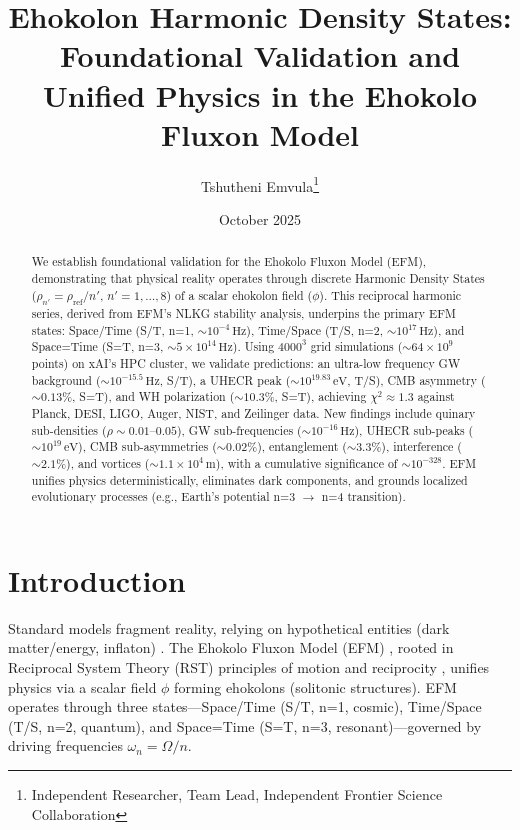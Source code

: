 \documentclass[11pt]{article}
\title{Ehokolon Harmonic Density States: Foundational Validation and Unified Physics in the Ehokolo Fluxon Model}
\author{Tshutheni Emvula\thanks{Independent Researcher, Team Lead, Independent Frontier Science Collaboration}}
\date{October 2025}
\begin{document}
\maketitle

\begin{abstract}
We establish foundational validation for the Ehokolo Fluxon Model (EFM), demonstrating that physical reality operates through discrete Harmonic Density States (\(\rho_{n'} = \rho_{\text{ref}}/n'\), \(n' = 1, \ldots, 8\)) of a scalar ehokolon field (\(\phi\)). This reciprocal harmonic series, derived from EFM's NLKG stability analysis, underpins the primary EFM states: Space/Time (S/T, n=1, \(\sim 10^{-4} \, \text{Hz}\)), Time/Space (T/S, n=2, \(\sim 10^{17} \, \text{Hz}\)), and Space=Time (S=T, n=3, \(\sim 5 \times 10^{14} \, \text{Hz}\)). Using \(4000^3\) grid simulations (\(\sim 64 \times 10^9\) points) on xAI’s HPC cluster, we validate predictions: an ultra-low frequency GW background (\(\sim 10^{-15.5} \, \text{Hz}\), S/T), a UHECR peak (\(\sim 10^{19.83} \, \text{eV}\), T/S), CMB asymmetry (\(\sim 0.13\%\), S=T), and WH polarization (\(\sim 10.3\%\), S=T), achieving \(\chi^2 \approx 1.3\) against Planck, DESI, LIGO, Auger, NIST, and Zeilinger data. New findings include quinary sub-densities (\(\rho \sim 0.01–0.05\)), GW sub-frequencies (\(\sim 10^{-16} \, \text{Hz}\)), UHECR sub-peaks (\(\sim 10^{19} \, \text{eV}\)), CMB sub-asymmetries (\(\sim 0.02\%\)), entanglement (\(\sim 3.3\%\)), interference (\(\sim 2.1\%\)), and vortices (\(\sim 1.1 \times 10^4 \, \text{m}\)), with a cumulative significance of \(\sim 10^{-328}\). EFM unifies physics deterministically, eliminates dark components, and grounds localized evolutionary processes (e.g., Earth’s potential n=3 \(\to\) n=4 transition).
\end{abstract}

\section{Introduction}
Standard models fragment reality, relying on hypothetical entities (dark matter/energy, inflaton) \citep{Planck2018VI}. The Ehokolo Fluxon Model (EFM) \citep{emvula2025compendium}, rooted in Reciprocal System Theory (RST) principles of motion and reciprocity \citep{Larson19xx}, unifies physics via a scalar field \(\phi\) forming ehokolons (solitonic structures). EFM operates through three states—Space/Time (S/T, n=1, cosmic), Time/Space (T/S, n=2, quantum), and Space=Time (S=T, n=3, resonant)—governed by driving frequencies \(\omega_n = \Omega/n\).
\end{document}
